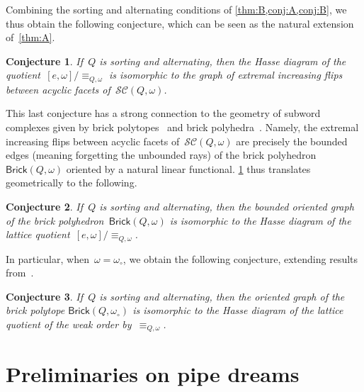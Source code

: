 \documentclass[reqno]{amsart}
\newtheorem{conjectureA}{Conjecture}
\theoremstyle{definition}
\newcommand{\wo}{\omega_\circ} %
\newcommand{\subwordComplex}{\mathcal{SC}} %
\newcommand{\brickPolyhedron}{\mathsf{Brick}} %
\begin{document}
Combining the sorting and alternating conditions of \cref{thm:B,conj:A,conj:B}, we thus obtain the following conjecture, which can be seen as the natural extension of~\cref{thm:A}.

\begin{conjectureA}
\label{conj:C}
If~$Q$ is sorting and alternating, then the Hasse diagram of the quotient~$[e, \omega]/\equiv_{Q, \omega}$ is isomorphic to the graph of extremal increasing flips between acyclic facets of~$\subwordComplex(Q, \omega)$.
\end{conjectureA}

This last conjecture has a strong connection to the geometry of subword complexes given by brick polytopes~\cite{PilaudSantos-brickPolytope, PilaudStump-brickPolytope} and brick polyhedra~\cite{JahnStump}.
Namely, the extremal increasing flips between acyclic facets of~$\subwordComplex(Q, \omega)$ are precisely the bounded edges (meaning forgetting the unbounded rays) of the brick polyhedron~$\brickPolyhedron(Q, \omega)$ oriented by a natural linear functional.
\cref{conj:C} thus translates geometrically to the following.

\begin{conjectureA}
\label{conj:D}
If~$Q$ is sorting and alternating, then the bounded oriented graph of the brick polyhedron~$\brickPolyhedron(Q, \omega)$ is isomorphic to the Hasse diagram of the lattice quotient~$[e, \omega]/\equiv_{Q, \omega}$.
\end{conjectureA}

In particular, when~$\omega = \wo$, we obtain the following conjecture, extending results from~\cite{Pilaud-brickAlgebra}.

\begin{conjectureA}
\label{conj:E}
If~$Q$ is sorting and alternating, then the oriented graph of the brick polytope $\brickPolyhedron(Q, \wo)$ is isomorphic to the Hasse diagram of the lattice quotient of the weak order by~$\equiv_{Q, \omega}$.
\end{conjectureA}


\section{Preliminaries on pipe dreams}
\label{sec:preliminaries}


\end{document}
